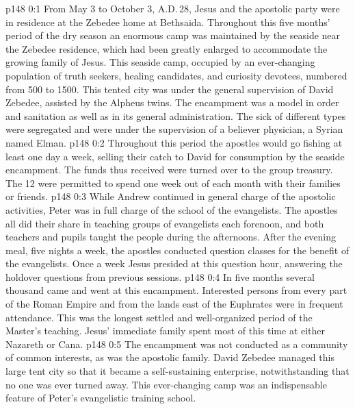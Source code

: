\author{Midwayer Commission}
\vs p148 0:1 From May 3 to October 3, A.D.\,28, Jesus and the apostolic party were in residence at the Zebedee home at Bethsaida. Throughout this five months’ period of the dry season an enormous camp was maintained by the seaside near the Zebedee residence, which had been greatly enlarged to accommodate the growing family of Jesus. This seaside camp, occupied by an ever\hyp{}changing population of truth seekers, healing candidates, and curiosity devotees, numbered from 500 to 1500. This tented city was under the general supervision of David Zebedee, assisted by the Alpheus twins. The encampment was a model in order and sanitation as well as in its general administration. The sick of different types were segregated and were under the supervision of a believer physician, a Syrian named Elman.
\vs p148 0:2 Throughout this period the apostles would go fishing at least one day a week, selling their catch to David for consumption by the seaside encampment. The funds thus received were turned over to the group treasury. The 12 were permitted to spend one week out of each month with their families or friends.
\vs p148 0:3 While Andrew continued in general charge of the apostolic activities, Peter was in full charge of the school of the evangelists. The apostles all did their share in teaching groups of evangelists each forenoon, and both teachers and pupils taught the people during the afternoons. After the evening meal, five nights a week, the apostles conducted question classes for the benefit of the evangelists. Once a week Jesus presided at this question hour, answering the holdover questions from previous sessions.
\vs p148 0:4 In five months several thousand came and went at this encampment. Interested persons from every part of the Roman Empire and from the lands east of the Euphrates were in frequent attendance. This was the longest settled and well\hyp{}organized period of the Master’s teaching. Jesus’ immediate family spent most of this time at either Nazareth or Cana.
\vs p148 0:5 The encampment was not conducted as a community of common interests, as was the apostolic family. David Zebedee managed this large tent city so that it became a self\hyp{}sustaining enterprise, notwithstanding that no one was ever turned away. This ever\hyp{}changing camp was an indispensable feature of Peter’s evangelistic training school.
